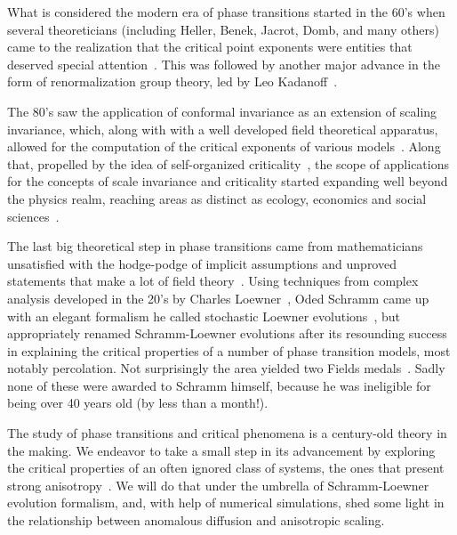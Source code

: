 What is considered the modern era of phase transitions started in the 60's when
several theoreticians (including Heller, Benek, Jacrot, Domb, and many others)
came to the realization that the critical point exponents were entities that
deserved special attention~\cite{Stanley1999, Stanley1971}. This was followed
by another major advance in the form of renormalization group theory, led by
Leo Kadanoff~\cite{Kadanoff1966}.

The 80's saw the application of conformal invariance as an extension of scaling
invariance, which, along with with a well developed field theoretical
apparatus, allowed for the computation of the critical exponents of various
models~\cite{Belavin1984, Henkel2013}. Along that, propelled by the idea of
self-organized criticality~\cite{Bak1987}, the scope of applications for the
concepts of scale invariance and criticality started expanding well beyond the
physics realm, reaching areas as distinct as ecology, economics and social
sciences~\cite{Christensen2005}.

The last big theoretical step in phase transitions came from mathematicians
unsatisfied with the hodge-podge of implicit assumptions and unproved
statements that make a lot of field theory~\cite{Langlands1994, Cardy2005}.
Using techniques from complex analysis developed in the 20's by Charles
Loewner~\cite{Loewner1923}, Oded Schramm came up with an elegant formalism he
called stochastic Loewner evolutions~\cite{Schramm2000}, but appropriately
renamed Schramm-Loewner evolutions after its resounding success in explaining
the critical properties of a number of phase transition models, most notably
percolation. Not surprisingly the area yielded two Fields
medals~\cite{Mackenzie2006, Kesten2010}. Sadly none of these were awarded to
Schramm himself, because he was ineligible for being over 40 years old (by less
than a month!).

The study of phase transitions and critical phenomena is a century-old theory
in the making. We endeavor to take a small step in its advancement by exploring
the critical properties of an often ignored class of systems, the ones that
present strong anisotropy~\cite{Henkel1994}. We will do that under the umbrella
of Schramm-Loewner evolution formalism, and, with help of numerical
simulations, shed some light in the relationship between anomalous diffusion
and anisotropic scaling.
